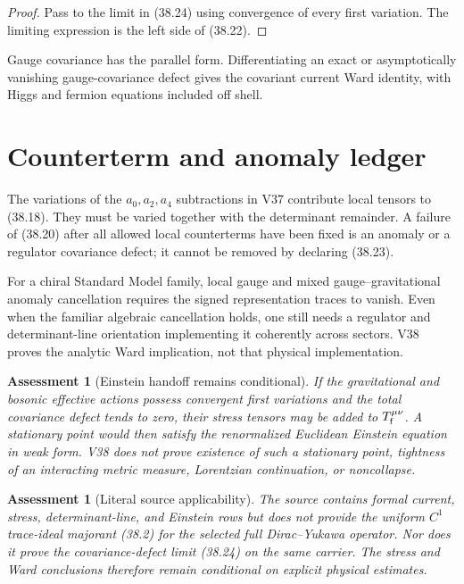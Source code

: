\documentclass[11pt]{article}
\newtheorem{assessment}[theorem]{Assessment}
\theoremstyle{remark}
\begin{document}
\begin{proof}
Pass to the limit in (38.24) using convergence of every first
variation.  The limiting expression is the left side of (38.22).
\end{proof}

Gauge covariance has the parallel form.  Differentiating an exact
or asymptotically vanishing gauge-covariance defect gives the
covariant current Ward identity, with Higgs and fermion equations
included off shell.

\section{Counterterm and anomaly ledger}

The variations of the \(a_0,a_2,a_4\) subtractions in V37 contribute
local tensors to (38.18).  They must be varied together with the
determinant remainder.  A failure of (38.20) after all allowed local
counterterms have been fixed is an anomaly or a regulator covariance
defect; it cannot be removed by declaring (38.23).

For a chiral Standard Model family, local gauge and mixed
gauge--gravitational anomaly cancellation requires the signed
representation traces to vanish.  Even when the familiar algebraic
cancellation holds, one still needs a regulator and determinant-line
orientation implementing it coherently across sectors.  V38 proves
the analytic Ward implication, not that physical implementation.

\begin{assessment}[Einstein handoff remains conditional]
\label{ass:v15v38-einstein}
If the gravitational and bosonic effective actions possess
convergent first variations and the total covariance defect tends to
zero, their stress tensors may be added to
\(T_{\rm f}^{\mu\nu}\).  A stationary point would then satisfy the
renormalized Euclidean Einstein equation in weak form.  V38 does not
prove existence of such a stationary point, tightness of an
interacting metric measure, Lorentzian continuation, or noncollapse.
\end{assessment}

\begin{assessment}[Literal source applicability]
\label{ass:v15v38-source}
The source contains formal current, stress, determinant-line, and
Einstein rows but does not provide the uniform \(C^1\)
trace-ideal majorant (38.2) for the selected full
Dirac--Yukawa operator.  Nor does it prove the covariance-defect
limit (38.24) on the same carrier.  The stress and Ward conclusions
therefore remain conditional on explicit physical estimates.
\end{assessment}
\end{document}
